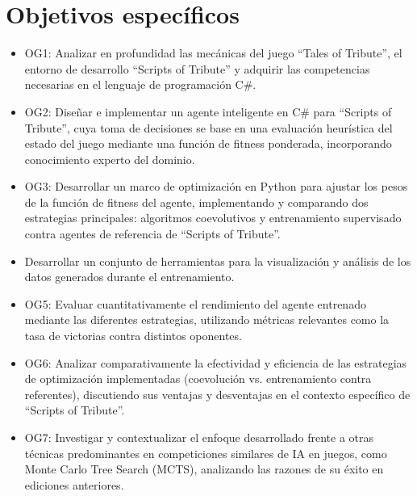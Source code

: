 \section{Objetivos específicos} \label{sec:objetivos_especificos}

\begin{itemize}
	\item OG1: Analizar en profundidad las mecánicas del juego ``Tales of Tribute'', el entorno de desarrollo ``Scripts of Tribute'' y adquirir las competencias necesarias en el lenguaje de programación C\#.
	\item OG2: Diseñar e implementar un agente inteligente en C\# para ``Scripts of Tribute'', cuya toma de decisiones se base en una evaluación heurística del estado del juego mediante una función de fitness ponderada, incorporando conocimiento experto del dominio.
	\item OG3: Desarrollar un marco de optimización en Python para ajustar los pesos de la función de fitness del agente, implementando y comparando dos estrategias principales: algoritmos coevolutivos y entrenamiento supervisado contra agentes de referencia de ``Scripts of Tribute''.
	\item Desarrollar un conjunto de herramientas para la visualización y análisis de los datos generados durante el entrenamiento.
	\item OG5: Evaluar cuantitativamente el rendimiento del agente entrenado mediante las diferentes estrategias, utilizando métricas relevantes como la tasa de victorias contra distintos oponentes.
	\item OG6: Analizar comparativamente la efectividad y eficiencia de las estrategias de optimización implementadas (coevolución vs. entrenamiento contra referentes), discutiendo sus ventajas y desventajas en el contexto específico de ``Scripts of Tribute''.
	\item OG7: Investigar y contextualizar el enfoque desarrollado frente a otras técnicas predominantes en competiciones similares de IA en juegos, como Monte Carlo Tree Search (MCTS), analizando las razones de su éxito en ediciones anteriores.
\end{itemize}